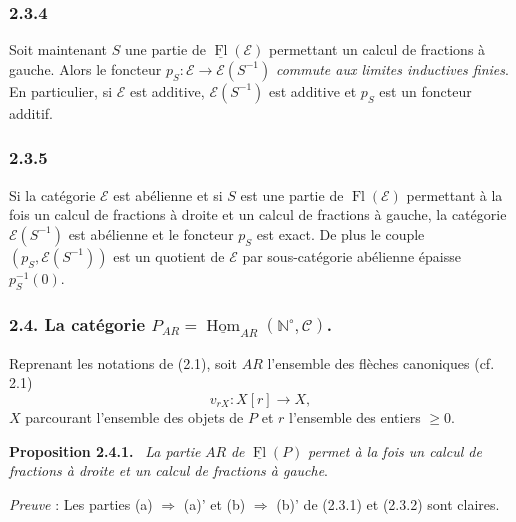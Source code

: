 \documentclass[11pt]{article}
\providecommand{\NN}{\mathbb{N}}
\newenvironment{statement}[1]{\par\medskip\noindent\textbf{#1.}\ }{\par\medskip}
\DeclareMathOperator{\Hom}{Hom}
\providecommand{\uHom}{\underline{\Hom}}
\providecommand{\Hom}{\operatorname{Hom}}
\providecommand{\Fl}{\operatorname{Fl}}
\providecommand{\NN}{\mathbb N}
\providecommand{\cC}{\mathcal C}
\providecommand{\cE}{\mathcal E}
\providecommand{\cC}{\mathcal C}
\providecommand{\Hom}{\operatorname{Hom}}
\begin{document}
\subsubsection*{2.3.4}
Soit maintenant $S$ une partie de $\underline{\Fl}(\cE)$ permettant un calcul de fractions à gauche. Alors le foncteur $p_S:\cE\to\cE(S^{-1})$ \emph{commute aux limites inductives finies}. En particulier, si $\cE$ est additive, $\cE(S^{-1})$ est additive et $p_S$ est un foncteur additif.

\subsubsection*{2.3.5}
Si la
catégorie $\cE$ est abélienne et si $S$ est une partie de $\Fl(\cE)$ permettant à la fois un calcul de fractions à droite et un calcul de fractions à gauche, la catégorie $\cE(S^{-1})$ est abélienne et le foncteur $p_S$ est exact. De plus le couple $(p_S,\cE(S^{-1}))$ est un quotient de $\cE$ par sous-catégorie abélienne épaisse $p_S^{-1}(0)$.

\subsubsection*{2.4. La catégorie $P_{AR}=\uHom_{AR}(\NN^\circ,\cC)$.}
Reprenant les notations de (2.1), soit $AR$ l'ensemble des flèches canoniques (cf. 2.1)
\[
v_{rX}:X[r]\longrightarrow X,
\]
$X$ parcourant l'ensemble des objets de $P$ et $r$ l'ensemble des entiers $\ge0$.

\begin{statement}{Proposition 2.4.1}
\emph{La partie} $AR$ \emph{de} $\underline{\Fl}(P)$ \emph{permet à la fois un calcul de fractions à droite et un calcul de fractions à gauche}.
\end{statement}

\emph{Preuve} : Les parties (a) $\Rightarrow$ (a)' et (b) $\Rightarrow$ (b)' de (2.3.1) et (2.3.2) sont claires.
\end{document}
